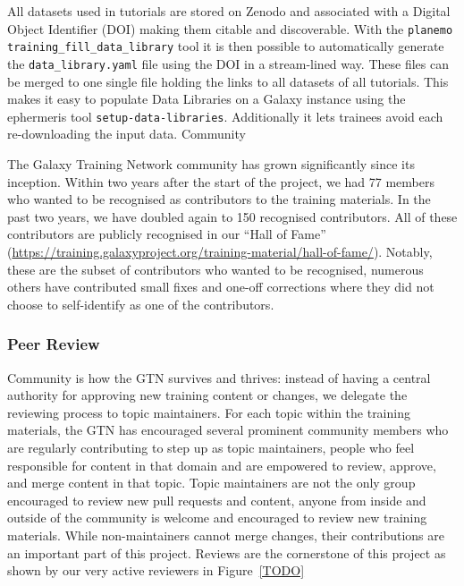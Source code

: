 \documentclass[10pt,letterpaper]{article}
\begin{document}
All datasets used in tutorials are stored on Zenodo and associated with a Digital Object Identifier (DOI) making them citable and discoverable.
With the \verb+planemo training_fill_data_library+ tool it is then possible to automatically generate the \verb+data_library.yaml+ file using the DOI in a stream-lined way.
These files can be merged to one single file holding the links to all datasets of all tutorials.
This makes it easy to populate Data Libraries on a Galaxy instance using the ephermeris tool \verb+setup-data-libraries+.
Additionally it lets trainees avoid each re-downloading the input data.
Community

The Galaxy Training Network community has grown significantly since its inception. Within two years after the start of the project, we had 77 members who wanted to be recognised as contributors to the training materials.
In the past two years, we have doubled again to 150 recognised contributors.
All of these contributors are publicly recognised in our “Hall of Fame” (\url{https://training.galaxyproject.org/training-material/hall-of-fame/}).
Notably, these are the subset of contributors who wanted to be recognised, numerous others have contributed small fixes and one-off corrections where they did not choose to self-identify as one of the contributors.

\subsubsection*{Peer Review}
Community is how the GTN survives and thrives: instead of having a central authority for approving new training content or changes, we delegate the reviewing process to topic maintainers.
For each topic within the training materials, the GTN has encouraged several prominent community members who are regularly contributing to step up as topic maintainers, people who feel responsible for content in that domain and are empowered to review, approve, and merge content in that topic.
Topic maintainers are not the only group encouraged to review new pull requests and content, anyone from inside and outside of the community is welcome and encouraged to review new training materials.
While non-maintainers cannot merge changes, their contributions are an important part of this project. Reviews are the cornerstone of this project as shown by our very active reviewers in Figure~\ref{TODO}
\end{document}
